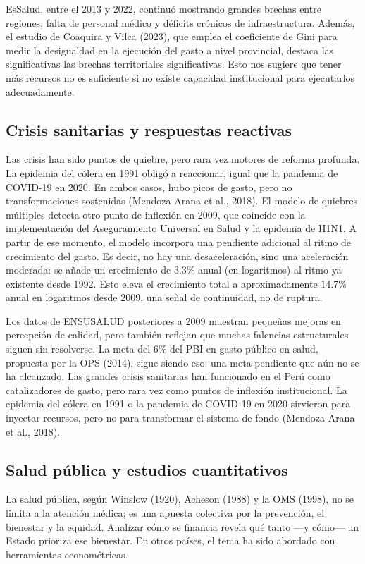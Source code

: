 \documentclass[12pt]{article}
\begin{document}
EsSalud, entre el 2013 y 2022, continuó mostrando grandes brechas entre regiones, falta de personal médico y déficits crónicos de infraestructura. Además, el estudio de Coaquira y Vilca (2023), que emplea el coeficiente de Gini para medir la desigualdad en la ejecución del gasto a nivel provincial, destaca las significativas las brechas territoriales significativas. Esto nos sugiere que tener más recursos no es suficiente si no existe capacidad institucional para ejecutarlos adecuadamente.

\subsection{Crisis sanitarias y respuestas reactivas}

Las crisis han sido puntos de quiebre, pero rara vez motores de reforma profunda. La epidemia del cólera en 1991 obligó a reaccionar, igual que la pandemia de COVID-19 en 2020. En ambos casos, hubo picos de gasto, pero no transformaciones sostenidas (Mendoza-Arana et al., 2018). El modelo de quiebres múltiples detecta otro punto de inflexión en 2009, que coincide con la implementación del Aseguramiento Universal en Salud y la epidemia de H1N1. A partir de ese momento, el modelo incorpora una pendiente adicional al ritmo de crecimiento del gasto. Es decir, no hay una desaceleración, sino una aceleración moderada: se añade un crecimiento de 3.3\% anual (en logaritmos) al ritmo ya existente desde 1992. Esto eleva el crecimiento total a aproximadamente 14.7\% anual en logaritmos desde 2009, una señal de continuidad, no de ruptura.

Los datos de ENSUSALUD posteriores a 2009 muestran pequeñas mejoras en percepción de calidad, pero también reflejan que muchas falencias estructurales siguen sin resolverse. La meta del 6\% del PBI en gasto público en salud, propuesta por la OPS (2014), sigue siendo eso: una meta pendiente que aún no se ha alcanzado. Las grandes crisis sanitarias han funcionado en el Perú como catalizadores de gasto, pero rara vez como puntos de inflexión institucional. La epidemia del cólera en 1991 o la pandemia de COVID-19 en 2020 sirvieron para inyectar recursos, pero no para transformar el sistema de fondo (Mendoza-Arana et al., 2018).

\subsection{Salud pública y estudios cuantitativos}

La salud pública, según Winslow (1920), Acheson (1988) y la OMS (1998), no se limita a la atención médica; es una apuesta colectiva por la prevención, el bienestar y la equidad. Analizar cómo se financia revela qué tanto —y cómo— un Estado prioriza ese bienestar. En otros países, el tema ha sido abordado con herramientas econométricas. 
\end{document}
